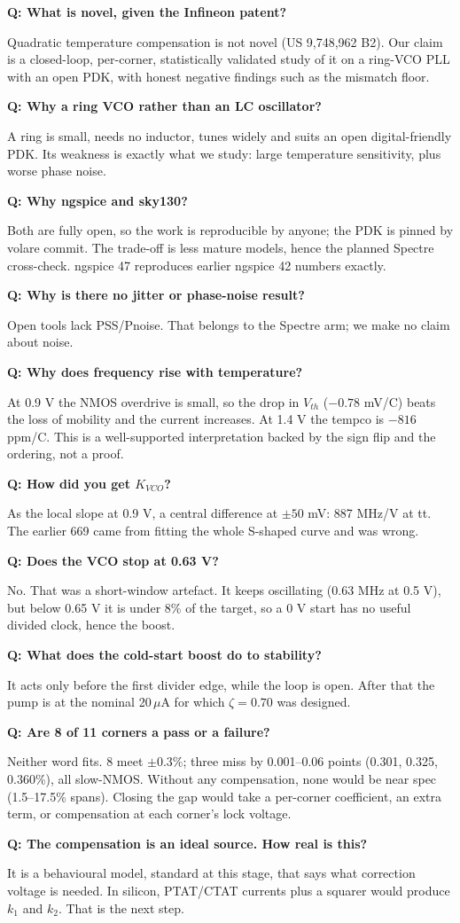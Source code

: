\documentclass[11pt,a4paper]{article}
\newcommand{\qa}[2]{\par\smallskip\noindent\textbf{Q: #1}\par\noindent\hspace*{1em}\begin{minipage}[t]{\dimexpr\linewidth-1em}#2\end{minipage}\par}
\newcommand{\degC}{\textdegree C}
\begin{document}
\qa{What is novel, given the Infineon patent?}{Quadratic temperature compensation is not novel (US 9,748,962 B2). Our claim is a closed-loop, per-corner, statistically validated study of it on a ring-VCO PLL with an open PDK, with honest negative findings such as the mismatch floor.}

\qa{Why a ring VCO rather than an LC oscillator?}{A ring is small, needs no inductor, tunes widely and suits an open digital-friendly PDK. Its weakness is exactly what we study: large temperature sensitivity, plus worse phase noise.}

\qa{Why ngspice and sky130?}{Both are fully open, so the work is reproducible by anyone; the PDK is pinned by volare commit. The trade-off is less mature models, hence the planned Spectre cross-check. ngspice 47 reproduces earlier ngspice 42 numbers exactly.}

\qa{Why is there no jitter or phase-noise result?}{Open tools lack PSS/Pnoise. That belongs to the Spectre arm; we make no claim about noise.}

\qa{Why does frequency rise with temperature?}{At 0.9 V the NMOS overdrive is small, so the drop in $V_{th}$ ($-0.78$ mV/\degC) beats the loss of mobility and the current increases. At 1.4 V the tempco is $-816$ ppm/\degC. This is a well-supported interpretation backed by the sign flip and the ordering, not a proof.}

\qa{How did you get $K_{VCO}$?}{As the local slope at 0.9 V, a central difference at $\pm50$ mV: 887 MHz/V at tt. The earlier 669 came from fitting the whole S-shaped curve and was wrong.}

\qa{Does the VCO stop at 0.63 V?}{No. That was a short-window artefact. It keeps oscillating (0.63 MHz at 0.5 V), but below 0.65 V it is under 8\% of the target, so a 0 V start has no useful divided clock, hence the boost.}

\qa{What does the cold-start boost do to stability?}{It acts only before the first divider edge, while the loop is open. After that the pump is at the nominal 20\,$\mu$A for which $\zeta=0.70$ was designed.}

\qa{Are 8 of 11 corners a pass or a failure?}{Neither word fits. 8 meet $\pm0.3\%$; three miss by 0.001--0.06 points (0.301, 0.325, 0.360\%), all slow-NMOS. Without any compensation, none would be near spec (1.5--17.5\% spans). Closing the gap would take a per-corner coefficient, an extra term, or compensation at each corner's lock voltage.}

\qa{The compensation is an ideal source. How real is this?}{It is a behavioural model, standard at this stage, that says what correction voltage is needed. In silicon, PTAT/CTAT currents plus a squarer would produce $k_1$ and $k_2$. That is the next step.}
\end{document}

